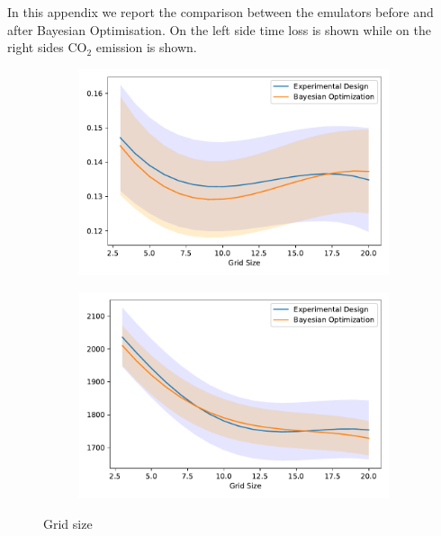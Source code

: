 

In this appendix we report the comparison between the emulators before and after Bayesian Optimisation. On the left side time loss is shown while on the right sides CO$_2$ emission is shown.


\begin{figure}[h!]
\centering
\begin{subfigure}{0.5\textwidth}
  \centering
  \includegraphics[width=\textwidth]{images/ofat_compare/time/grid_size.pdf}
\end{subfigure}%
\begin{subfigure}{0.5\textwidth}
  \centering
  \includegraphics[width=\textwidth]{images/ofat_compare/co2/grid_size.pdf}
\end{subfigure}
\caption{Grid size}
\end{figure}

